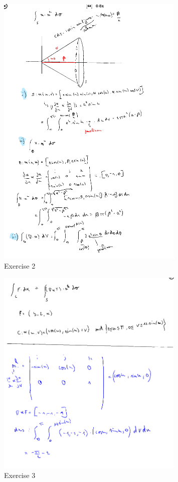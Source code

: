 \documentclass[a4paper]{report}
\begin{document}
\begin{figure}[H]
	\centering
	\includegraphics[width=0.8\textwidth]{assets/bord_7_ex_2.png}
	\caption{Exercise 2}
	\label{fig:bord_7_ex_2}
\end{figure}

\begin{figure}[H]
	\centering
	\includegraphics[width=0.8\textwidth]{assets/bord_7_ex_1.png}
	\caption{Exercise 3}
	\label{fig:bord_7_ex_3}
\end{figure}
\end{document}
